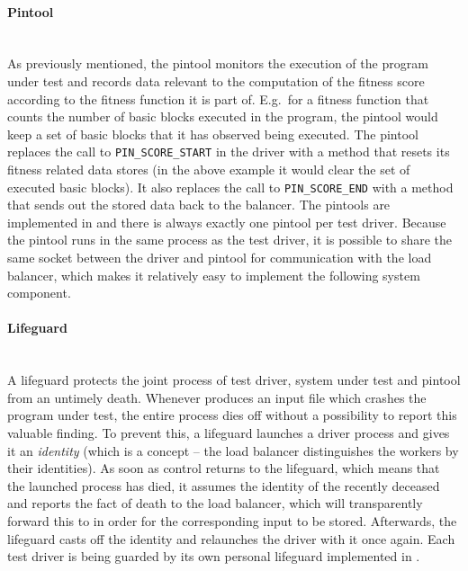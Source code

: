   \paragraph{Pintool} ~\\
  As previously mentioned, the pintool monitors the execution of the program under test and records
  data relevant to the computation of the fitness score according to the fitness function it is part of.
  E.g.\ for a fitness function that counts the number of basic blocks executed in the program, the pintool 
  would keep a set of basic blocks that it has observed being executed. The pintool replaces the call to 
  \texttt{PIN\_SCORE\_START} in the driver with a method that resets its fitness related data stores (in the 
  above example it would clear the set of executed basic blocks). It also replaces the call to
  \texttt{PIN\_SCORE\_END} with a method that sends out the stored data back to the balancer. 
  The pintools are implemented in \cpp and there is always exactly one pintool per test driver.
  Because the pintool runs in the same process as the test driver, it is possible to share the same \zmq
  socket between the driver and pintool for communication with the load balancer, which makes it relatively
  easy to implement the following system component.
  \paragraph{Lifeguard} ~\\
  A lifeguard protects the joint process of test driver, system under test and pintool from an untimely
  death. Whenever \xmlmate produces an input file which crashes the program under test, the entire process dies
  off without a possibility to report this valuable finding. To prevent this, a lifeguard launches a driver
  process and gives it an \emph{identity} (which is a \zmq concept -- the load balancer distinguishes the
  workers by their identities). As soon as control returns to the lifeguard, which means that the launched
  process has died, it assumes the identity of the recently deceased and reports the fact of death to the load
  balancer, which will transparently forward this to \xmlmate in order for the corresponding input to be
  stored. Afterwards, the lifeguard casts off the identity and relaunches the driver with it once again.
  Each test driver is being guarded by its own personal lifeguard implemented in \python.

